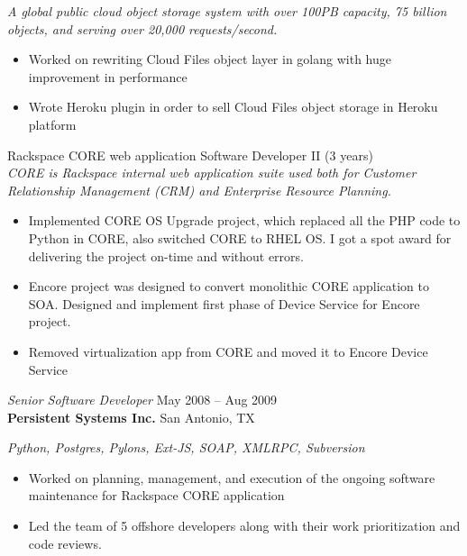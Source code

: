 \documentclass[margin,line]{resume}
\begin{document}
\begin{resume}
{\small\textit{A global public cloud object storage system with over 100PB capacity, 75 billion
objects, and serving over 20,000 requests/second.}}
\begin{itemize} \itemsep -2pt %
\small\item Worked on rewriting Cloud Files object layer in golang with huge improvement in performance
\small\item Wrote Heroku plugin in order to sell Cloud Files object storage in Heroku platform
\end{itemize}\vspace{-\baselineskip} %
\vspace{4pt}
{\small Rackspace CORE web application  \hfill  Software Developer II (3 years)}\\
{\small\textit{CORE is Rackspace internal web application suite used both for Customer Relationship Management (CRM) and Enterprise Resource Planning.}}
\begin{itemize} \itemsep -2pt %
\small\item Implemented CORE OS Upgrade project, which replaced all the PHP code to Python in CORE, also switched CORE to RHEL OS. I got a spot award for delivering the project on-time and without errors. 
\small\item Encore project was designed to convert monolithic CORE application to SOA. Designed and implement first phase of Device Service for Encore project. 
\small\item Removed virtualization app from CORE and moved it to Encore Device Service 
\end{itemize}
\vspace{4pt}

{\sl Senior Software Developer } \hfill
     May 2008 – Aug 2009\\
     \textbf{Persistent Systems Inc.} \hfill
     San Antonio, TX\\[4pt]
{\small\centering\textit{Python, Postgres, Pylons, Ext-JS, SOAP, XMLRPC, Subversion }\par}\vspace*{-\baselineskip}
\vspace{4pt}
\begin{itemize} \itemsep -2pt %
\small\item Worked on planning, management, and execution of the ongoing software maintenance for Rackspace CORE application
\small\item Led the team of 5 offshore developers along with their work prioritization and code reviews.
\end{itemize}
\vspace{-\baselineskip} %


\end{resume}
\end{document}
